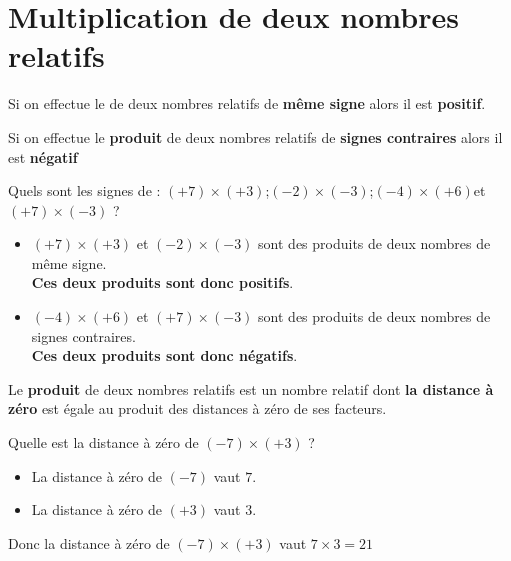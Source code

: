 \section{Multiplication de deux nombres relatifs}

\begin{propriete}
  Si on effectue le \textbf{} de deux nombres relatifs de \textbf{m\^{e}me signe} alors il est \textbf{positif}.
\end{propriete}

\begin{propriete}
  Si on effectue le \textbf{produit} de deux nombres relatifs de \textbf{signes contraires} alors il est \textbf{n\'egatif}
\end{propriete}

\begin{exemple*1}
  Quels sont les signes de : $(+7)\times (+3)$\hfill ;\hfill$(-2)\times(-3)$\hfill ;\hfill $(-4)\times(+6)$\hfill et \hfill $(+7)\times(-3)$ ?
  \correction
  \begin{itemize}
    \item $(+7)\times (+3)$ et $(-2)\times(-3)$ sont des produits de deux nombres de même signe.\\
    \textbf{Ces deux produits sont donc positifs}.
    \item $(-4)\times(+6)$ et $(+7)\times(-3)$ sont des produits de deux nombres de signes contraires.\\
    \textbf{Ces deux produits sont donc négatifs}.
  \end{itemize}
\end{exemple*1}

\begin{propriete}
  Le \textbf{produit} de deux nombres relatifs est un nombre relatif dont \textbf{la distance à zéro} est égale au produit des distances à zéro de ses facteurs.
\end{propriete}

\begin{exemple*1}
  Quelle est la distance à zéro de $(-7)\times (+3)$ ?
  \correction
  \begin{itemize}
    \item La distance à zéro de $(-7)$ vaut $7$.
    \item La distance à zéro de $(+3)$ vaut $3$.
  \end{itemize}
  Donc la distance à zéro de $(-7)\times (+3)$ vaut $7\times 3= 21$
\end{exemple*1}

